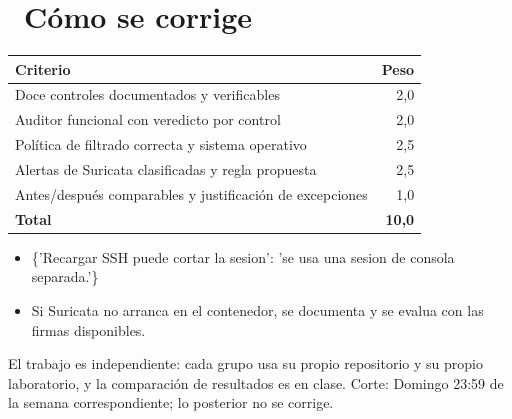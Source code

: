 \documentclass[11pt,a4paper]{article}
\newcommand{\iconotexto}[2]{\textcolor{cyanNeon}{\faIcon{#1}}~#2}
\begin{document}
\section{\iconotexto{ruler-combined}{Cómo se corrige}}

\begin{tabularx}{\linewidth}{@{}X r@{}}
\toprule
Criterio & Peso\\
\midrule
Doce controles documentados y verificables & 2,0 \\
Auditor funcional con veredicto por control & 2,0 \\
Política de filtrado correcta y sistema operativo & 2,5 \\
Alertas de Suricata clasificadas y regla propuesta & 2,5 \\
Antes/después comparables y justificación de excepciones & 1,0 \\
\midrule
\textbf{Total} & \textbf{10,0}\\
\bottomrule
\end{tabularx}

\begin{itemize}[leftmargin=1.4em,itemsep=2pt,topsep=3pt]
  \item \{'Recargar SSH puede cortar la sesion': 'se usa una sesion de consola separada.'\}
  \item Si Suricata no arranca en el contenedor, se documenta y se evalua con las firmas disponibles.
\end{itemize}

\begin{cajaRecuerda}El trabajo es independiente: cada grupo usa su propio repositorio y su propio laboratorio, y la comparación de resultados es en clase. Corte: Domingo 23:59 de la semana correspondiente; lo posterior no se corrige.
\end{cajaRecuerda}
\end{document}
